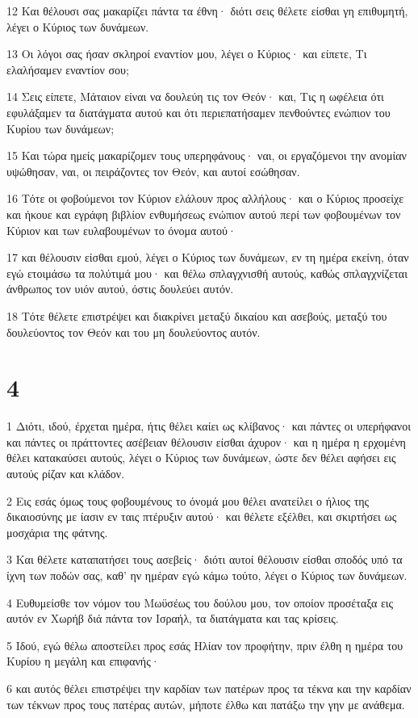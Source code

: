 \par 12 Και θέλουσι σας μακαρίζει πάντα τα έθνη· διότι σεις θέλετε είσθαι γη επιθυμητή, λέγει ο Κύριος των δυνάμεων.
\par 13 Οι λόγοι σας ήσαν σκληροί εναντίον μου, λέγει ο Κύριος· και είπετε, Τι ελαλήσαμεν εναντίον σου;
\par 14 Σεις είπετε, Μάταιον είναι να δουλεύη τις τον Θεόν· και, Τις η ωφέλεια ότι εφυλάξαμεν τα διατάγματα αυτού και ότι περιεπατήσαμεν πενθούντες ενώπιον του Κυρίου των δυνάμεων;
\par 15 Και τώρα ημείς μακαρίζομεν τους υπερηφάνους· ναι, οι εργαζόμενοι την ανομίαν υψώθησαν, ναι, οι πειράζοντες τον Θεόν, και αυτοί εσώθησαν.
\par 16 Τότε οι φοβούμενοι τον Κύριον ελάλουν προς αλλήλους· και ο Κύριος προσείχε και ήκουε και εγράφη βιβλίον ενθυμήσεως ενώπιον αυτού περί των φοβουμένων τον Κύριον και των ευλαβουμένων το όνομα αυτού·
\par 17 και θέλουσιν είσθαι εμού, λέγει ο Κύριος των δυνάμεων, εν τη ημέρα εκείνη, όταν εγώ ετοιμάσω τα πολύτιμά μου· και θέλω σπλαγχνισθή αυτούς, καθώς σπλαγχνίζεται άνθρωπος τον υιόν αυτού, όστις δουλεύει αυτόν.
\par 18 Τότε θέλετε επιστρέψει και διακρίνει μεταξύ δικαίου και ασεβούς, μεταξύ του δουλεύοντος τον Θεόν και του μη δουλεύοντος αυτόν.

\chapter{4}

\par 1 Διότι, ιδού, έρχεται ημέρα, ήτις θέλει καίει ως κλίβανος· και πάντες οι υπερήφανοι και πάντες οι πράττοντες ασέβειαν θέλουσιν είσθαι άχυρον· και η ημέρα η ερχομένη θέλει κατακαύσει αυτούς, λέγει ο Κύριος των δυνάμεων, ώστε δεν θέλει αφήσει εις αυτούς ρίζαν και κλάδον.
\par 2 Εις εσάς όμως τους φοβουμένους το όνομά μου θέλει ανατείλει ο ήλιος της δικαιοσύνης με ίασιν εν ταις πτέρυξιν αυτού· και θέλετε εξέλθει, και σκιρτήσει ως μοσχάρια της φάτνης.
\par 3 Και θέλετε καταπατήσει τους ασεβείς· διότι αυτοί θέλουσιν είσθαι σποδός υπό τα ίχνη των ποδών σας, καθ' ην ημέραν εγώ κάμω τούτο, λέγει ο Κύριος των δυνάμεων.
\par 4 Ευθυμείσθε τον νόμον του Μωϋσέως του δούλου μου, τον οποίον προσέταξα εις αυτόν εν Χωρήβ διά πάντα τον Ισραήλ, τα διατάγματα και τας κρίσεις.
\par 5 Ιδού, εγώ θέλω αποστείλει προς εσάς Ηλίαν τον προφήτην, πριν έλθη η ημέρα του Κυρίου η μεγάλη και επιφανής·
\par 6 και αυτός θέλει επιστρέψει την καρδίαν των πατέρων προς τα τέκνα και την καρδίαν των τέκνων προς τους πατέρας αυτών, μήποτε έλθω και πατάξω την γην με ανάθεμα.


